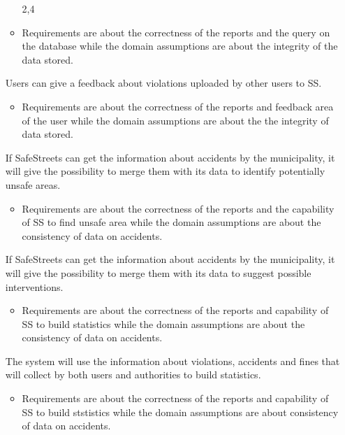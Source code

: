 \documentclass[../RASD.tex]{subfiles}
\begin{document}
\begin{enumerate}
\begin{itemize}
                        \assumption{} 2,4
                        \item Requirements are about the correctness of the reports and the query on the database while the domain assumptions are about the integrity of the data stored.
                    \end{itemize}
                     Users can give a feedback about violations uploaded by other users to SS.
                    \begin{itemize}
                        \requirement{} 1,2,3,4,5,6,7,8,23,22,24
                        \assumption{} 2,4
                        \item Requirements are about the correctness of the reports and feedback area of the user while the domain assumptions are about the the integrity of data stored.
                    \end{itemize}
                     If SafeStreets can get the information about accidents by the municipality, it will give the possibility to merge them with its data to identify potentially unsafe areas.
                    \begin{itemize}
                        \requirement{} 7,8,13,16,17,18,19,22,29
                        \assumption{} 3,5
                        \item Requirements are about the correctness of the reports and the capability of SS to find unsafe area while the domain assumptions are about the consistency of data on accidents.
                    \end{itemize}
                     If SafeStreets can get the information about accidents by the municipality, it will give the possibility to merge them with its data to suggest possible interventions.
                    \begin{itemize}
                        \requirement{} 5,6,7,8,17,18,19,20,22,25,29
                        \assumption{} 3,5
                        \item Requirements are about the correctness of the reports and capability of SS to build statistics while the domain assumptions are about the consistency of data on accidents.
                    \end{itemize}
                     The system will use the information about violations, accidents and fines that will collect by both users and authorities to build statistics.
                    \begin{itemize}
                        \requirement{} 5,6,7,8,17,18,19,23,24,22,27,29
                        \assumption{} 2,5
                        \item Requirements are about the correctness of the reports and capability of SS to build ststistics while the domain assumptions are about consistency of data on accidents.
                    \end{itemize}\end{enumerate}
\end{document}
